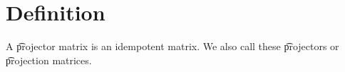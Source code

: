 

\section*{Definition}

A \t{projector matrix} is an idempotent matrix.
We also call these \t{projectors} or \t{projection matrices}.

